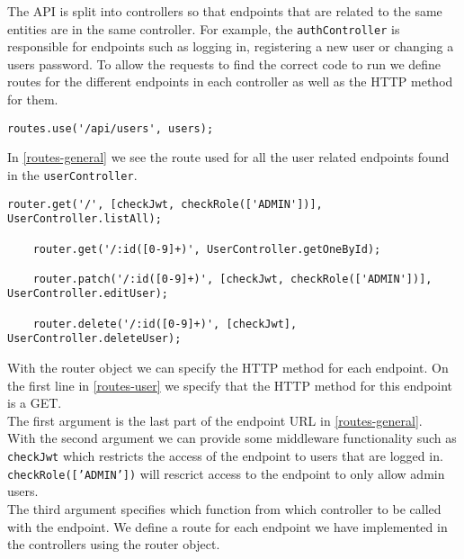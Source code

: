 The API is split into controllers so that endpoints that are related to the same entities are in the same controller. 
For example, the \texttt{authController} is responsible for endpoints such as logging in, registering a new user or changing a users password.
To allow the requests to find the correct code to run we define routes for the different endpoints in each controller as well as the HTTP method for them.

\begin{lstlisting}[caption={The route used for all user related endpoints}, captionpos=b, label={routes-general}]
    routes.use('/api/users', users);
\end{lstlisting}
In \autoref{routes-general} we see the route used for all the user related endpoints found in the \texttt{userController}.
\begin{lstlisting}[caption={Some of the routes for the different user endpoints}, captionpos=b, label={routes-user}]
    router.get('/', [checkJwt, checkRole(['ADMIN'])], UserController.listAll);

    router.get('/:id([0-9]+)', UserController.getOneById);

    router.patch('/:id([0-9]+)', [checkJwt, checkRole(['ADMIN'])], UserController.editUser);

    router.delete('/:id([0-9]+)', [checkJwt], UserController.deleteUser);
\end{lstlisting}
With the router object we can specify the HTTP method for each endpoint. 
On the first line in \autoref{routes-user} we specify that the HTTP method for this endpoint is a GET.
\\
The first argument is the last part of the endpoint URL in \autoref{routes-general}. 
\\
With the second argument we can provide some middleware functionality such as \texttt{checkJwt} which restricts the access of the endpoint to users that are logged in.
\texttt{checkRole(['ADMIN'])} will rescrict access to the endpoint to only allow admin users. 
\\
The third argument specifies which function from which controller to be called with the endpoint.
We define a route for each endpoint we have implemented in the controllers using the router object.

